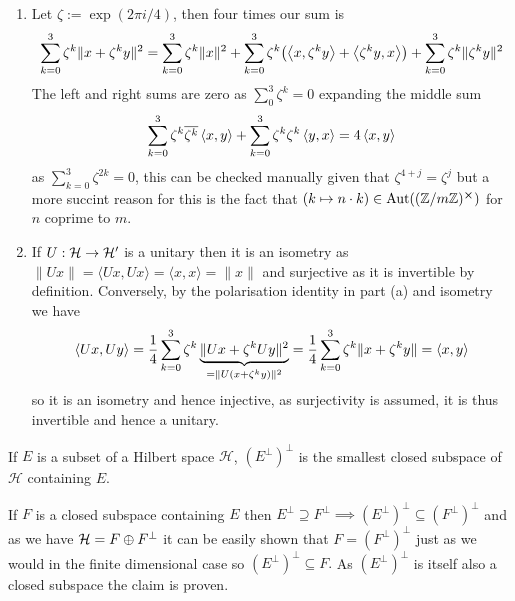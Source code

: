 \documentclass[12pt,a4paper]{article}
\begin{document}
\begin{solution}
    \begin{enumerate}[label=\alph*.]
        \item Let $\zeta:=\exp(2\pi i/4)$, then four times our sum is 
            \[
                \sum_{k=0}^3\zeta^k\|x+\zeta^ky\|^2=\sum_{k=0}^3\zeta^k\|x\|^2+\sum_{k=0}^3\zeta^k\qty(\left\langle x,\zeta^ky\right\rangle+\left\langle\zeta^ky,x\right\rangle)+\sum_{k=0}^3\zeta^k\|\zeta^ky\|^2 
            \]
            The left and right sums are zero as $\sum_0^3\zeta^k=0$ expanding the middle sum 
            \[
                \sum_{k=0}^3\zeta^k \overline{\zeta^k}\left\langle x,y\right\rangle+\sum_{k=0}^3\zeta^k\zeta^k\left\langle y,x\right\rangle=4\left\langle x,y\right\rangle
            \]
            as $\sum_{k=0}^3\zeta^{2k}=0$, this can be checked manually given that $\zeta^{4+j}=\zeta^j$ but a more succint reason for this is the fact that $(k\mapsto n\cdot k)\in\operatorname{Aut}((\mathbb{Z}/m\mathbb{Z})^{\cross})$ for $n$ coprime to $m.$  
        \item If $U:\mathcal{H}\to\mathcal{H}'$ is a unitary then it is an isometry as $\|Ux\|=\langle Ux,Ux\rangle=\langle x,x\rangle=\|x\|$ and surjective as it is invertible by definition. 
            Conversely, by the polarisation identity in part (a) and isometry we have 
            \[
                \left\langle Ux,Uy\right\rangle= \frac{1}{4}\sum_{k=0}^3\zeta^k\underbrace{\|Ux+\zeta^kUy\|^2}_{=\|U(x+\zeta^k y)\|^2}= \frac{1}{4}\sum_{k=0}^3\zeta^k\|x+\zeta^ky\|=\left\langle x,y\right\rangle
            \]
            so it is an isometry and hence injective, as surjectivity is assumed, it is thus invertible and hence a unitary.   
    \end{enumerate}
\end{solution}
\begin{problem}\label{prob:5-56}
If $E$ is a subset of a Hilbert space $\mathcal{H}$, $(E^\perp)^\perp$ is the smallest closed subspace of $\mathcal{H}$ containing $E$.
\end{problem}
\begin{solution}
    If $F$ is a closed subspace containing $E$ then $E^\perp \supseteq F^\perp\implies (E^\perp)^\perp \subseteq(F^\perp)^\perp$ and as we have $\mathcal{H}=F\oplus F^\perp$ it can be easily shown that $F=(F^\perp)^\perp$ just as we would in the finite dimensional case so $(E^\perp)^\perp \subseteq F.$ 
    As $(E^\perp)^\perp$ is itself also a closed subspace the claim is proven. 
\end{solution}
\end{document}
